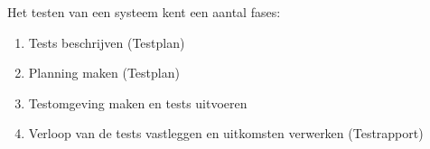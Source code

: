 Het testen van een systeem kent een aantal fases:
\begin{enumerate}
\item Tests beschrijven (Testplan)
\item Planning maken (Testplan)
\item Testomgeving maken en tests uitvoeren
\item Verloop van de tests vastleggen en uitkomsten verwerken (Testrapport)
\end{enumerate}
